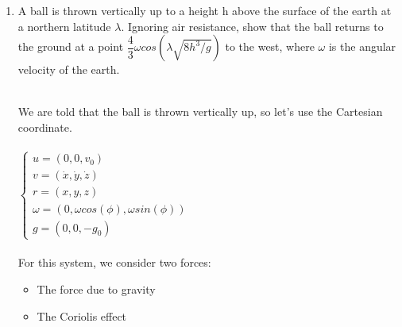 \documentclass[fleqn]{article}
\begin{document}
\begin{enumerate}
    \item A ball is thrown vertically up to a height h above the surface of the earth at a northern latitude $\lambda$. Ignoring air resistance, show that the
    ball returns to the ground at a point $\dfrac{4}{3} \omega cos(\lambda \sqrt{8h^3/g})$ to the west, where $\omega$ is the angular velocity of the earth.

      \textcolor{hwColor}{
        \\
        We are told that the ball is thrown vertically up, so let's use the Cartesian coordinate. \\
        \\
        $
          \begin{cases}
            u=(0,0,v_0)
            \\
            v=(\dot{x}, \dot{y}, \dot{z})
            \\
            r=(x,y,z)
            \\
            \omega=(0, \omega cos(\phi), \omega sin(\phi))
            \\
            g=(0, 0, -g_0)
          \end{cases}
        $
        \\
        \\
        For this system, we consider two forces:
        \begin{itemize}
          \item The force due to gravity
          \item The Coriolis effect
        \end{itemize}
      }


\end{enumerate}
\end{document}
